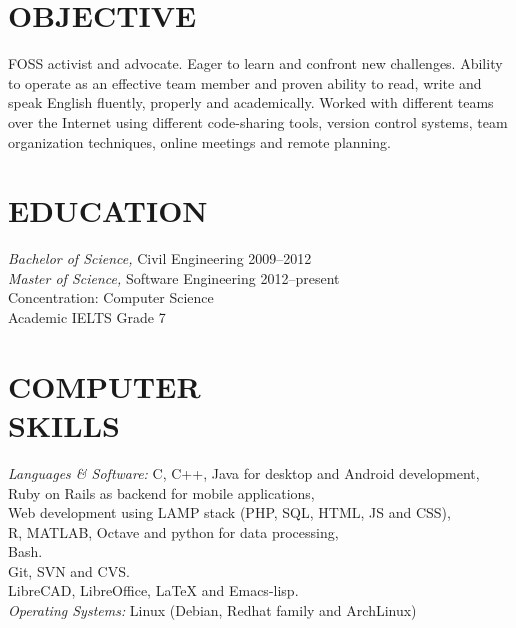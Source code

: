 \documentclass[margin, 10pt]{res} %
\begin{document}
\begin{resume}


\section{OBJECTIVE}
FOSS activist and advocate. Eager to learn and confront new challenges.
Ability to operate as an effective team member and
proven ability to read, write and speak English fluently, properly and academically.
Worked with different teams over the Internet using different code-sharing tools,
version control systems, team organization techniques, online meetings and remote
planning.

\section{EDUCATION}

{\sl Bachelor of Science,} Civil Engineering 2009--2012 \\
{\sl Master of Science,} Software Engineering 2012--present\\
Concentration: Computer Science \\
Academic IELTS Grade 7

\section{COMPUTER \\ SKILLS}

{\sl Languages \& Software:}
C, C++, Java for desktop and Android development, \\
Ruby on Rails as backend for mobile applications, \\
Web development using LAMP stack (PHP, SQL, HTML, JS and CSS), \\
R, MATLAB, Octave and python for data processing, \\
Bash. \\
Git, SVN and CVS.\\
LibreCAD, LibreOffice, LaTeX and Emacs-lisp. \\
{\sl Operating Systems:} Linux (Debian, Redhat family and ArchLinux)
 

\end{resume}
\end{document}

